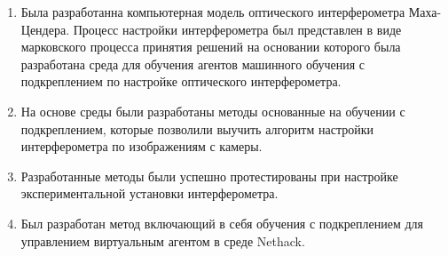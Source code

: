 \begin{enumerate}
  \item Была разработанна компьютерная модель оптического интерферометра Маха-Цендера. Процесс настройки интерферометра был представлен в виде марковского процесса принятия решений на основании которого была разработана среда для обучения агентов машинного обучения с подкреплением по настройке оптического интерферометра. 
  \item На основе среды были разработаны методы основанные на обучении с подкреплением, которые позволили выучить алгоритм настройки интерферометра по изображениям с камеры. 
  \item Разработанные методы были успешно протестированы при настройке экспериментальной установки интерферометра. 
  \item Был разработан метод включающий в себя обучения с подкреплением для управлением виртуальным агентом в среде Nethack. 
\end{enumerate}
